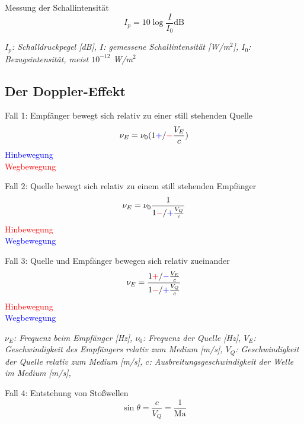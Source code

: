 \documentclass[a4paper,10pt]{article}
\newenvironment{displayformula}
{
	\begin{framed}
		\color{formulaColor}
	}
	{\end{framed}}
\newcommand{\formulalegend}[1]{%
	\par\vspace{0.5ex}%
	{{\color{legendColor}\RaggedRight\small\textit{#1}}}%
	\par\vspace{1.5ex}%
}
\begin{document}
\begin{displayformula}
	Messung der Schallintensität
	\[
	I_p = 10\log \frac{I}{I_0} \text{dB}
	\]
\end{displayformula}
\formulalegend{
	$I_p$: Schalldruckpegel [dB], 
	$I$: gemessene Schallintensität [W/m$^2$], 
	$I_0$: Bezugsintensität, meist $10^{-12}$ W/m$^2$
}



\subsection{Der Doppler-Effekt}



\begin{displayformula}
	Fall 1: Empfänger bewegt sich relativ zu einer still stehenden Quelle
	\[
	\nu_E = \nu_0 (1 \textcolor{blue}{+} / \textcolor{red}{-} \frac{V_E}{c})
	\]
	\textcolor{blue}{Hinbewegung} \\
	\textcolor{red}{Wegbewegung}
\end{displayformula}


\begin{displayformula}
	Fall 2: Quelle bewegt sich relativ zu einem still stehenden Empfänger
	\[
	\nu_E = \nu_0 \frac{1}{1 \textcolor{red}{-} / \textcolor{blue}{+} \frac{V_Q}{c}}
	\]
	\textcolor{red}{Hinbewegung} \\
	\textcolor{blue}{Wegbewegung}
\end{displayformula}

\begin{displayformula}
	Fall 3: Quelle und Empfänger bewegen sich relativ zueinander
	\[
	\nu_E = \frac{1 \textcolor{red}{+} / \textcolor{blue}{-} \frac{V_E}{c}}{1 \textcolor{red}{-} / \textcolor{blue}{+} \frac{V_Q}{c}}
	\]
	\textcolor{red}{Hinbewegung} \\
	\textcolor{blue}{Wegbewegung}
\end{displayformula}

\formulalegend{
	$\nu_E$: Frequenz beim Empfänger [Hz], 
	$\nu_0$: Frequenz der Quelle [Hz], 
	$V_E$: Geschwindigkeit des Empfängers relativ zum Medium [m/s], 
	$V_Q$: Geschwindigkeit der Quelle relativ zum Medium [m/s], 
	$c$: Ausbreitungsgeschwindigkeit der Welle im Medium [m/s], 
}

\begin{displayformula}
	Fall 4: Entstehung von Stoßwellen
	\[
	\sin \theta = \frac{c}{V_Q} = \frac{1}{\text{Ma}}
	\]
\end{displayformula}
\end{document}
